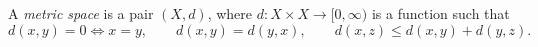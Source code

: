 
A \emph{metric space} is a pair $(X,d)$, where $d:X\times X\to[0,\infty)$ is a function such that
\[
d(x,y)=0\iff x=y,\qquad d(x,y)=d(y,x),\qquad
d(x,z)\le d(x,y)+d(y,z).
\]
